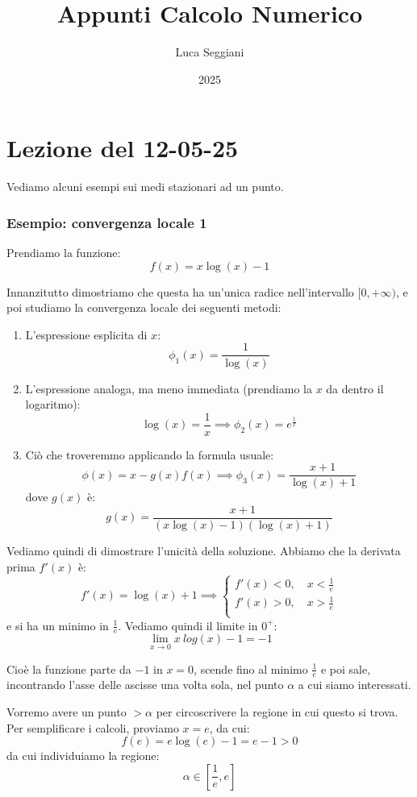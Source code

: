 \documentclass[a4paper,11pt]{article}
\title{Appunti Calcolo Numerico}
\author{Luca Seggiani}
\date{2025}
\begin{document}
\section{Lezione del 12-05-25}

\thispagestyle{empty}
\pagestyle{fancy}

Vediamo alcuni esempi sui medi stazionari ad un punto.

\subsubsection{Esempio: convergenza locale 1}
Prendiamo la funzione:
$$
f(x) = x \log(x) - 1
$$

Innanzitutto dimostriamo che questa ha un'unica radice nell'intervallo $[0, +\infty)$, e poi studiamo la convergenza locale dei seguenti metodi:
\begin{enumerate}
	\item L'espressione esplicita di $x$:
		$$
		\phi_1(x) = \frac{1}{\log(x)}
		$$
	\item L'espressione analoga, ma meno immediata (prendiamo la $x$ da dentro il logaritmo):
		$$
		\log(x) = \frac{1}{x} \implies \phi_2(x) = e^{\frac{1}{x}}
		$$
	\item Ciò che troveremmo applicando la formula usuale:
		$$
		\phi(x) = x - g(x) f(x) \implies \phi_3(x) = \frac{x + 1}{\log(x) + 1}
		$$
		dove $g(x)$ è:
		$$
		g(x) = \frac{x + 1}{(x \log(x)  - 1)(\log(x) + 1)}
		$$
\end{enumerate}

Vediamo quindi di dimostrare l'unicità della soluzione.
Abbiamo che la derivata prima $f'(x)$ è:
$$
f'(x) = \log(x) + 1 \implies 
\begin{cases}
	f'(x) < 0, \quad x < \frac{1}{e} \\			
	f'(x) > 0, \quad x > \frac{1}{e} \\			
\end{cases}
$$
e si ha un minimo in $\frac{1}{e}$.
Vediamo quindi il limite in $0^+$:
$$
\lim_{x\rightarrow 0} x\ log(x) - 1 = -1
$$

Cioè la funzione parte da $-1$ in $x = 0$, scende fino al minimo $\frac{1}{e}$ e poi sale, incontrando l'asse delle ascisse una volta sola, nel punto $\alpha$ a cui siamo interessati.

Vorremo avere un punto $> \alpha$ per circoscrivere la regione in cui questo si trova.
Per semplificare i calcoli, proviamo $x = e$, da cui:
$$
f(e) = e \log(e) - 1 = e - 1 > 0
$$
da cui individuiamo la regione:
$$
\alpha \in \left[\frac{1}{e}, e\right]
$$
\end{document}
